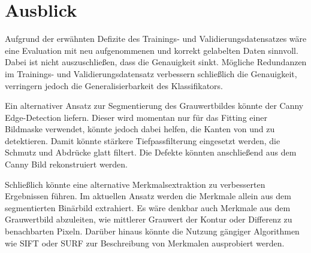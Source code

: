 \chapter{Ausblick}

Aufgrund der erwähnten Defizite des Trainings- und Validierungsdatensatzes wäre eine Evaluation mit neu aufgenommenen und korrekt gelabelten Daten sinnvoll. Dabei ist nicht auszuschließen, dass die Genauigkeit sinkt. Mögliche Redundanzen im Trainings- und Validierungsdatensatz verbessern schließlich die Genauigkeit, verringern jedoch die Generalisierbarkeit des Klassifikators.

Ein alternativer Ansatz zur Segmentierung des Grauwertbildes könnte der \foreignlanguage{english}{Canny Edge-Detection} liefern. Dieser wird momentan nur für das Fitting einer Bildmaske verwendet, könnte jedoch dabei helfen, die Kanten von  und  zu detektieren. Damit könnte stärkere Tiefpassfilterung eingesetzt werden, die Schmutz und Abdrücke glatt filtert. Die Defekte könnten anschließend aus dem \foreignlanguage{english}{Canny} Bild rekonstruiert werden.

Schließlich könnte eine alternative Merkmalsextraktion zu verbesserten Ergebnissen führen. Im aktuellen Ansatz werden die Merkmale allein aus dem segmentierten Binärbild extrahiert. Es wäre denkbar auch Merkmale aus dem Grauwertbild abzuleiten, wie mittlerer Grauwert der Kontur oder Differenz zu benachbarten Pixeln. Darüber hinaus könnte die Nutzung gängiger Algorithmen wie SIFT oder SURF zur Beschreibung von Merkmalen ausprobiert werden.
